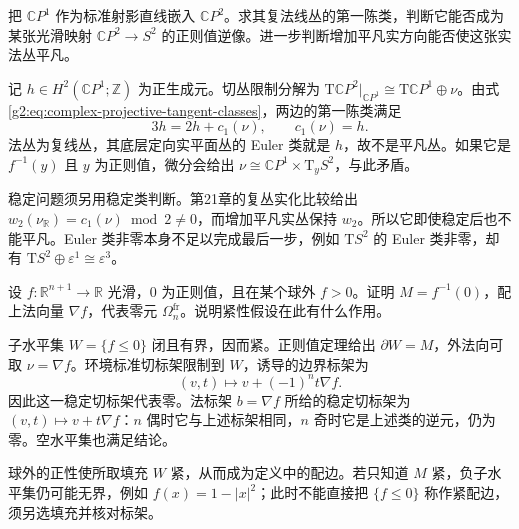 \begin{exercise}\label{g2:ex:cp-line-normal-framing-obstruction}
	把 \(\mathbb CP^1\) 作为标准射影直线嵌入 \(\mathbb CP^2\)。求其复法线丛的第一陈类，判断它能否成为某张光滑映射 \(\mathbb CP^2\to S^2\) 的正则值逆像。进一步判断增加平凡实方向能否使这张实法丛平凡。
\end{exercise}
\begin{solution}
	记 \(h\in H^2(\mathbb CP^1;\mathbb Z)\) 为正生成元。切丛限制分解为 \(\mathrm T\mathbb CP^2|_{\mathbb CP^1}\cong\mathrm T\mathbb CP^1\oplus\nu\)。由式\eqref{g2:eq:complex-projective-tangent-classes}，两边的第一陈类满足
	\[
		3h=2h+c_1(\nu),\qquad c_1(\nu)=h.
	\]
	法丛为复线丛，其底层定向实平面丛的 Euler 类就是 \(h\)，故不是平凡丛。如果它是 \(f^{-1}(y)\) 且 \(y\) 为正则值，微分会给出 \(\nu\cong\mathbb CP^1\times\mathrm T_yS^2\)，与此矛盾。

	稳定问题须另用稳定类判断。第21章的复丛实化比较给出 \(w_2(\nu_{\mathbb R})=c_1(\nu)\bmod2\ne0\)，而增加平凡实丛保持 \(w_2\)。所以它即使稳定后也不能平凡。Euler 类非零本身不足以完成最后一步，例如 \(\mathrm TS^2\) 的 Euler 类非零，却有 \(\mathrm TS^2\oplus\varepsilon^1\cong\varepsilon^3\)。
\end{solution}

\begin{exercise}\label{g2:ex:compact-level-framed-boundary}
	设 \(f:\mathbb R^{n+1}\to\mathbb R\) 光滑，\(0\) 为正则值，且在某个球外 \(f>0\)。证明 \(M=f^{-1}(0)\)，配上法向量 \(\nabla f\)，代表零元 \(\Omega_n^{\mathrm{fr}}\)。说明紧性假设在此有什么作用。
\end{exercise}
\begin{solution}
	子水平集 \(W=\{f\le0\}\) 闭且有界，因而紧。正则值定理给出 \(\partial W=M\)，外法向可取 \(\nu=\nabla f\)。环境标准切标架限制到 \(W\)，诱导的边界标架为
	\[
		(v,t)\longmapsto v+(-1)^nt\nabla f.
	\]
	因此这一稳定切标架代表零。法标架 \(b=\nabla f\) 所给的稳定切标架为 \((v,t)\mapsto v+t\nabla f\)：\(n\) 偶时它与上述标架相同，\(n\) 奇时它是上述类的逆元，仍为零。空水平集也满足结论。

	球外的正性使所取填充 \(W\) 紧，从而成为定义中的配边。若只知道 \(M\) 紧，负子水平集仍可能无界，例如 \(f(x)=1-|x|^2\)；此时不能直接把 \(\{f\le0\}\) 称作紧配边，须另选填充并核对标架。
\end{solution}

